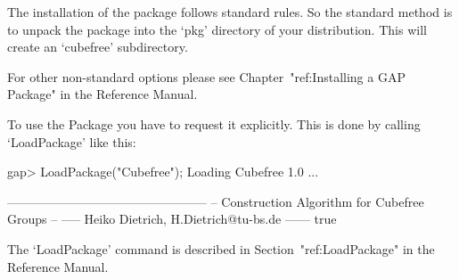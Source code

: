 

\null

The installation of the {\Cubefree} package follows standard {\GAP} rules.
So the standard method is to unpack the package into the `pkg'
directory  of your {\GAP} distribution.  This will create an `cubefree'
subdirectory.

For other non-standard options please see Chapter~"ref:Installing a
GAP Package" in the {\GAP} Reference Manual.


\null

To use the {\Cubefree} Package you have to request it explicitly. This  is
done by calling `LoadPackage' like this:

\beginexample
gap> LoadPackage("Cubefree");
Loading Cubefree 1.0 ...

   ------------------------------------------------
   -- Construction Algorithm for Cubefree Groups --
   ----- Heiko Dietrich, H.Dietrich@tu-bs.de ------
true
\endexample

The `LoadPackage' command is described in Section~"ref:LoadPackage"
in the {\GAP} Reference Manual.

